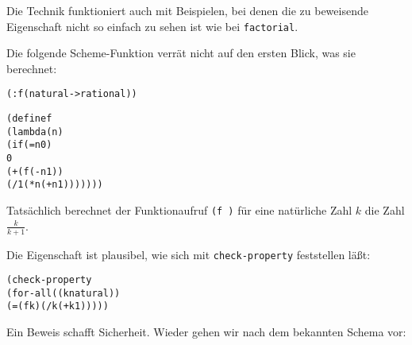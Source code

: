 Die Technik funktioniert auch mit Beispielen, bei denen die zu
beweisende Eigenschaft nicht so einfach zu sehen ist wie bei
\texttt{factorial}.

Die folgende Scheme-Funktion verrät nicht auf den ersten Blick, was
sie berechnet:
%
\begin{alltt}
(: f (natural -> rational))

(define f
  (lambda (n)
    (if (= n 0)
        0
        (+ (f (- n 1))
           (/ 1 (* n (+ n 1)))))))
\end{alltt}
%
Tatsächlich berechnet der Funktionaufruf \texttt{(f )} für
eine natürliche Zahl $k$ die Zahl
\(\frac{k}{k+1}\).

Die Eigenschaft ist plausibel, wie sich mit \texttt{check-property}
feststellen läßt:
%
\begin{alltt}
(check-property
 (for-all ((k natural))
   (= (f k) (/ k (+ k 1)))))
\end{alltt}
%
Ein Beweis schafft Sicherheit.  Wieder gehen wir nach dem bekannten
Schema vor:
%

